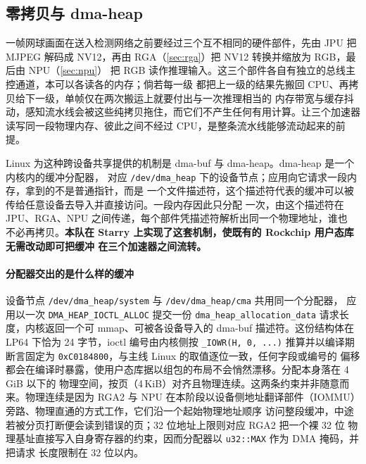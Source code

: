 \subsection{零拷贝与 dma-heap}\label{sec:dmaheap}

一帧网球画面在送入检测网络之前要经过三个互不相同的硬件部件，先由 JPU 把 MJPEG 解码成
NV12，再由 RGA（\ref{sec:rga}）把 NV12 转换并缩放为 RGB，最后由 NPU（\ref{sec:npu}）
把 RGB 读作推理输入。这三个部件各自有独立的总线主控通道，本可以各读各的内存；倘若每一级
都把上一级的结果先搬回 CPU、再拷贝给下一级，单帧仅在两次搬运上就要付出与一次推理相当的
内存带宽与缓存抖动，感知流水线会被这些纯拷贝拖住，而它们不产生任何有用计算。让三个加速器
读写同一段物理内存、彼此之间不经过 CPU，是整条流水线能够流动起来的前提。

Linux 为这种跨设备共享提供的机制是 dma-buf 与 dma-heap。dma-heap 是一个内核内的缓冲分配器，
对应 \texttt{/dev/dma\_heap} 下的设备节点；应用向它请求一段内存，拿到的不是普通指针，而是
一个文件描述符，这个描述符代表的缓冲可以被传给任意设备去导入并直接访问。一段内存因此只分配
一次，由这个描述符在 JPU、RGA、NPU 之间传递，每个部件凭描述符解析出同一个物理地址，谁也
不必再拷贝。\textbf{本队在 Starry 上实现了这套机制，使既有的 Rockchip 用户态库无需改动即可把缓冲
在三个加速器之间流转。}


\paragraph{分配器交出的是什么样的缓冲}
设备节点 \texttt{/dev/dma\_heap/system} 与 \texttt{/dev/dma\_heap/cma} 共用同一个分配器，
应用以一次 \texttt{DMA\_HEAP\_IOCTL\_ALLOC} 提交一份 \texttt{dma\_heap\_allocation\_data}
请求长度，内核返回一个可 mmap、可被各设备导入的 dma-buf 描述符。这份结构体在 LP64 下恰为
24 字节，ioctl 编号由内核侧按 \texttt{\_IOWR(\textquotesingle H\textquotesingle, 0, ...)}
推算并以编译期断言固定为 \texttt{0xC0184800}，与主线 Linux 的取值逐位一致，任何字段或编号的
偏移都会在编译时暴露，使用户态库据以组包的布局不会悄然漂移。分配本身落在 4\,GiB 以下的
物理空间，按页（4\,KiB）对齐且物理连续。这两条约束并非随意而来。物理连续是因为 RGA2 与 NPU
在本阶段以设备侧地址翻译部件（IOMMU）旁路、物理直通的方式工作，它们沿一个起始物理地址顺序
访问整段缓冲，中途若被分页打断便会读到错误的页；32 位地址上限则对应 RGA2 把一个裸 32 位
物理基址直接写入自身寄存器的约束，因而分配器以 \texttt{u32::MAX} 作为 DMA 掩码，并把请求
长度限制在 32 位以内。

